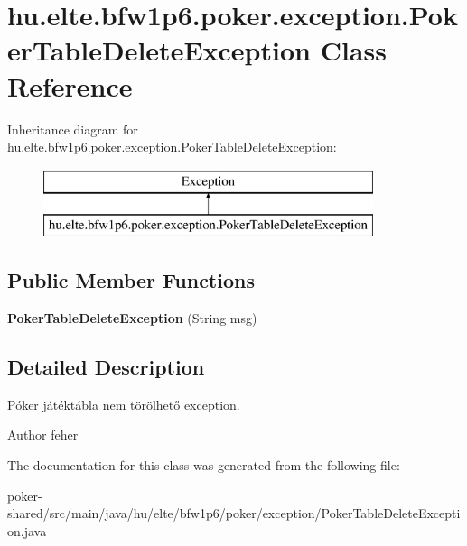 \hypertarget{classhu_1_1elte_1_1bfw1p6_1_1poker_1_1exception_1_1_poker_table_delete_exception}{}\section{hu.\+elte.\+bfw1p6.\+poker.\+exception.\+Poker\+Table\+Delete\+Exception Class Reference}
\label{classhu_1_1elte_1_1bfw1p6_1_1poker_1_1exception_1_1_poker_table_delete_exception}
Inheritance diagram for hu.\+elte.\+bfw1p6.\+poker.\+exception.\+Poker\+Table\+Delete\+Exception\+:\begin{figure}[H]
\begin{center}
\leavevmode
\includegraphics[height=2.000000cm]{classhu_1_1elte_1_1bfw1p6_1_1poker_1_1exception_1_1_poker_table_delete_exception}
\end{center}
\end{figure}
\subsection*{Public Member Functions}
\begin{DoxyCompactItemize}
\item 
\hypertarget{classhu_1_1elte_1_1bfw1p6_1_1poker_1_1exception_1_1_poker_table_delete_exception_af81e8325d0c69bf788ce1ecd5d5faaee}{}{\bfseries Poker\+Table\+Delete\+Exception} (String msg)\label{classhu_1_1elte_1_1bfw1p6_1_1poker_1_1exception_1_1_poker_table_delete_exception_af81e8325d0c69bf788ce1ecd5d5faaee}

\end{DoxyCompactItemize}


\subsection{Detailed Description}
Póker játéktábla nem törölhető exception. \begin{DoxyAuthor}{Author}
feher 
\end{DoxyAuthor}


The documentation for this class was generated from the following file\+:\begin{DoxyCompactItemize}
\item 
poker-\/shared/src/main/java/hu/elte/bfw1p6/poker/exception/Poker\+Table\+Delete\+Exception.\+java\end{DoxyCompactItemize}
